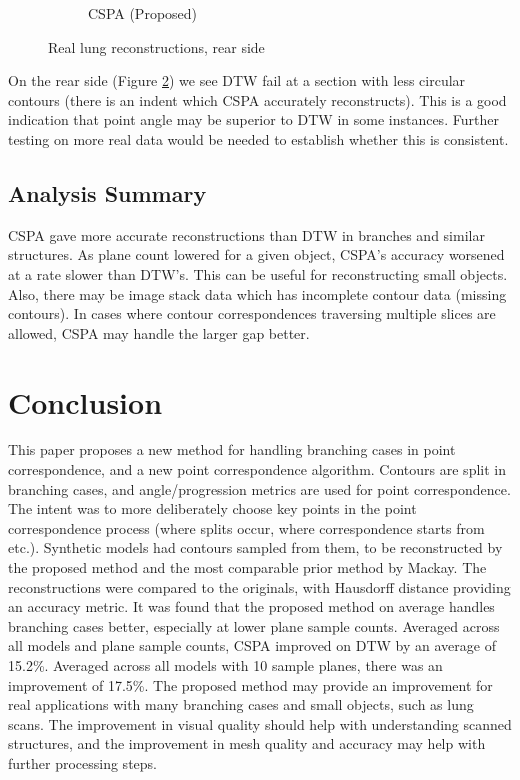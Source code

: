 \documentclass[11p, titlepage]{article}
\begin{document}
\begin{figure}[h!]
\begin{subfigure}[b]{0.45\textwidth}
         \caption{CSPA (Proposed)}
         \label{fig:cspa50_real_back}
     \end{subfigure}
        \caption{Real lung reconstructions, rear side}
        \label{fig:real_reconstructions_back}
\end{figure}

On the rear side (Figure \ref{fig:real_reconstructions_back}) we see DTW fail at a section with less circular contours (there is an indent which CSPA accurately reconstructs). This is a good indication that point angle may be superior to DTW in some instances. Further testing on more real data would be needed to establish whether this is consistent.
\pagebreak

\subsection{Analysis Summary}

CSPA gave more accurate reconstructions than DTW in branches and similar structures. As plane count lowered for a given object, CSPA's accuracy worsened at a rate slower than DTW's. This can be useful for reconstructing small objects. Also, there may be image stack data which has incomplete contour data (missing contours). In cases where contour correspondences traversing multiple slices are allowed, CSPA may handle the larger gap better.

\section{Conclusion}

This paper proposes a new method for handling branching cases in point correspondence, and a new point correspondence algorithm. Contours are split in branching cases, and angle/progression metrics are used for point correspondence. The intent was to more deliberately choose key points in the point correspondence process (where splits occur, where correspondence starts from etc.). Synthetic models had contours sampled from them, to be reconstructed by the proposed method and the most comparable prior method by Mackay. The reconstructions were compared to the originals, with Hausdorff distance providing an accuracy metric. It was found that the proposed method on average handles branching cases better, especially at lower plane sample counts. Averaged across all models and plane sample counts, CSPA improved on DTW by an average of 15.2\%. Averaged across all models with 10 sample planes, there was an improvement of 17.5\%. The proposed method may provide an improvement for real applications with many branching cases and small objects, such as lung scans. The improvement in visual quality should help with understanding scanned structures, and the improvement in mesh quality and accuracy may help with further processing steps.
\end{document}
